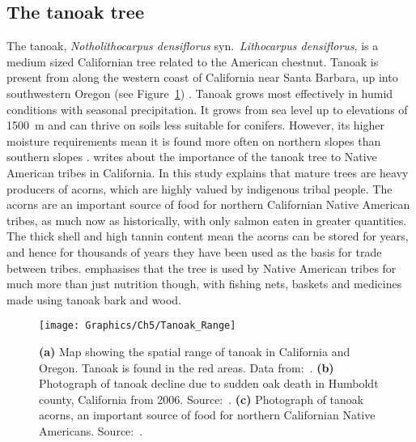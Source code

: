 \subsection{The tanoak tree}

The tanoak, \textit{Notholithocarpus densiflorus} syn.~\textit{Lithocarpus densiflorus}, is a medium sized Californian tree related to the American chestnut. Tanoak is present from along the western coast of California near Santa Barbara, up into southwestern Oregon (see Figure~\ref{fig:ch5:tanoak_range}) \citep{tappeiner_lithocarpus_1990}. Tanoak grows most effectively in humid conditions with seasonal precipitation. It grows from sea level up to elevations of \SI{1500}{\meter} and can thrive on soils less suitable for conifers. However, its higher moisture requirements mean it is found more often on northern slopes than southern slopes \citep{tappeiner_lithocarpus_1990}. \citet{bowcutt_tanoak_2013} writes about the importance of the tanoak tree to Native American tribes in California. In this study \citeauthor{bowcutt_tanoak_2013} explains that mature trees are heavy producers of acorns, which are highly valued by indigenous tribal people. The acorns are an important source of food for northern Californian Native American tribes, as much now as historically, with only salmon eaten in greater quantities. The thick shell and high tannin content mean the acorns can be stored for years, and hence for thousands of years they have been used as the basis for trade between tribes. \citeauthor{bowcutt_tanoak_2013} emphasises that the tree is used by Native American tribes for much more than just nutrition though, with fishing nets, baskets and medicines made using tanoak bark and wood.

\begin{figure}
    \begin{center}
        \texttt{[image: Graphics/Ch5/Tanoak\_Range]}
        \caption[The tanoak tree: pictures and map of spatial range]{\textbf{(a)} Map showing the spatial range of tanoak in California and Oregon. Tanoak is found in the red areas. Data from:~\citet{plant_maps}. \textbf{(b)} Photograph of tanoak decline due to sudden oak death in Humboldt county, California from 2006. Source:~\citet{tanoak_pict2}. \textbf{(c)} Photograph of tanoak acorns, an important source of food for northern Californian Native Americans. Source:~\citet{tanoak_pict}.\label{fig:ch5:tanoak_range}}
    \end{center}
\end{figure}

